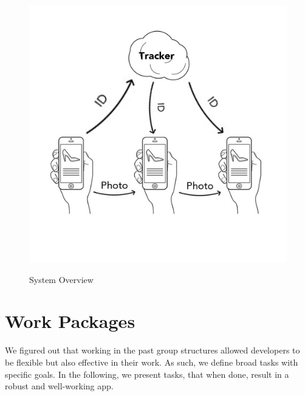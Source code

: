 \documentclass{report}
\newcommand{\lfig}[1]{\label{fig:#1}}
\begin{document}
\begin{figure}[h]
	\centering
    \includegraphics[width=\columnwidth]{overview.jpg}
    \lfig{system-overview}
    \vspace{-5mm} %
	\caption{System Overview~\cite{estimote}}
\end{figure}

\section{Work Packages}
We figured out that working in the past group structures allowed developers to be flexible but also effective in their work. As such, we define broad tasks with specific goals.
In the following, we present tasks, that when done, result in a robust and well-working app.
\end{document}
